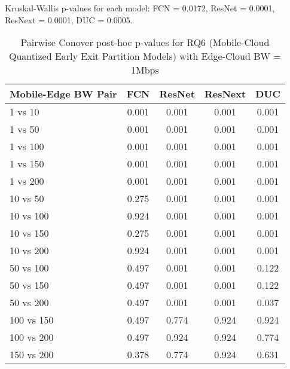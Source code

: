 \begin{table}[h]
\centering
\caption{Pairwise Conover post-hoc p-values for RQ6 (Mobile-Cloud Quantized Early Exit Partition Models) with Edge-Cloud BW = 1Mbps}
\label{tab:conover_mobile_cloud_quantized_earlyexit_partition_ec1}
\smallskip
Kruskal-Wallis p-values for each model: FCN = 0.0172, ResNet = 0.0001, ResNext = 0.0001, DUC = 0.0005.

\begin{tabular}{lcccc}
\toprule
Mobile-Edge BW Pair & FCN & ResNet & ResNext & DUC \\
\midrule
1 vs 10 & 0.001 & 0.001 & 0.001 & 0.001 \\
1 vs 50 & 0.001 & 0.001 & 0.001 & 0.001 \\
1 vs 100 & 0.001 & 0.001 & 0.001 & 0.001 \\
1 vs 150 & 0.001 & 0.001 & 0.001 & 0.001 \\
1 vs 200 & 0.001 & 0.001 & 0.001 & 0.001 \\
10 vs 50 & 0.275 & 0.001 & 0.001 & 0.001 \\
10 vs 100 & 0.924 & 0.001 & 0.001 & 0.001 \\
10 vs 150 & 0.275 & 0.001 & 0.001 & 0.001 \\
10 vs 200 & 0.924 & 0.001 & 0.001 & 0.001 \\
50 vs 100 & 0.497 & 0.001 & 0.001 & 0.122 \\
50 vs 150 & 0.497 & 0.001 & 0.001 & 0.122 \\
50 vs 200 & 0.497 & 0.001 & 0.001 & 0.037 \\
100 vs 150 & 0.497 & 0.774 & 0.924 & 0.924 \\
100 vs 200 & 0.497 & 0.924 & 0.924 & 0.774 \\
150 vs 200 & 0.378 & 0.774 & 0.924 & 0.631 \\
\bottomrule
\end{tabular}
\end{table}

